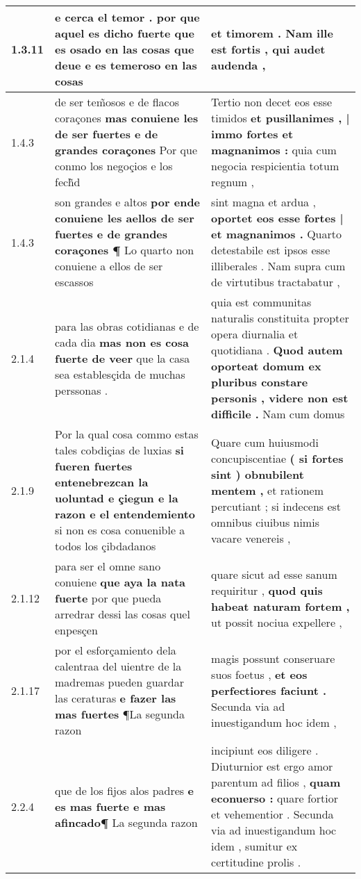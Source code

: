 \begin{tabular}{|p{1cm}|p{6.5cm}|p{6.5cm}|}
1.3.11 & e cerca el temor . \textbf{ por que aquel es dicho fuerte } que es osado en las cosas que deue e es temeroso en las cosas & et timorem . \textbf{ Nam ille est fortis , } qui audet audenda , \\\hline
1.4.3 & de ser tem̃osos e de flacos coraçones \textbf{ mas conuiene les de ser fuertes e de grandes coraçones } Por que conmo los negoçios e los fech̃d & Tertio non decet eos esse timidos \textbf{ et pusillanimes , | immo fortes et magnanimos : } quia cum negocia respicientia totum regnum , \\\hline
1.4.3 & son grandes e altos \textbf{ por ende conuiene les aellos de ser fuertes e de grandes coraçones ¶ } Lo quarto non conuiene a ellos de ser escassos & sint magna et ardua , \textbf{ oportet eos esse fortes | et magnanimos . } Quarto detestabile est ipsos esse illiberales . Nam supra cum de virtutibus tractabatur , \\\hline
2.1.4 & para las obras cotidianas e de cada dia \textbf{ mas non es cosa fuerte de veer } que la casa sea establesçida de muchas perssonas . & quia est communitas naturalis constituita propter opera diurnalia et quotidiana . \textbf{ Quod autem oporteat domum ex pluribus constare personis , videre non est difficile . } Nam cum domus \\\hline
2.1.9 & Por la qual cosa commo estas tales cobdiçias de luxias \textbf{ si fueren fuertes entenebrezcan la uoluntad e çiegun e la razon e el entendemiento } si non es cosa conuenible a todos los çibdadanos & Quare cum huiusmodi concupiscentiae \textbf{ ( si fortes sint ) obnubilent mentem , } et rationem percutiant ; si indecens est omnibus ciuibus nimis vacare venereis , \\\hline
2.1.12 & para ser el omne sano conuiene \textbf{ que aya la nata fuerte } por que pueda arredrar dessi las cosas quel enpesçen & quare sicut ad esse sanum requiritur , \textbf{ quod quis habeat naturam fortem , } ut possit nociua expellere , \\\hline
2.1.17 & por el esforçamiento dela calentraa del uientre de la madremas pueden guardar las ceraturas \textbf{ e fazer las mas fuertes } ¶La segunda razon & magis possunt conseruare suos foetus , \textbf{ et eos perfectiores faciunt . } Secunda via ad inuestigandum hoc idem , \\\hline
2.2.4 & que de los fijos alos padres \textbf{ e es mas fuerte e mas afincado¶ } La segunda razon & incipiunt eos diligere . Diuturnior est ergo amor parentum ad filios , \textbf{ quam econuerso : } quare fortior et vehementior . Secunda via ad inuestigandum hoc idem , sumitur ex certitudine prolis . \\\hline

\end{tabular}
